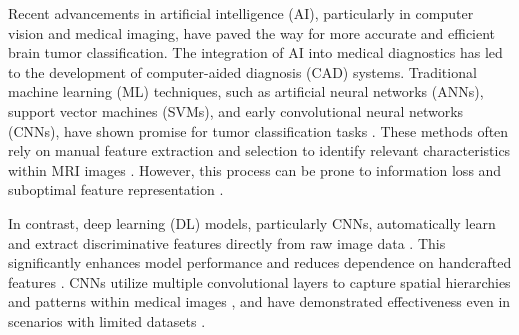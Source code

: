 \documentclass[a4paper,fleqn]{cas-sc}
\begin{document}
Recent advancements in artificial intelligence (AI), particularly in computer vision and medical imaging, have paved the way for more accurate and efficient brain tumor classification. The integration of AI into medical diagnostics has led to the development of computer-aided diagnosis (CAD) systems. Traditional machine learning (ML) techniques, such as artificial neural networks (ANNs), support vector machines (SVMs), and early convolutional neural networks (CNNs), have shown promise for tumor classification tasks \cite{R11, R12, R13, R14, R15}. These methods often rely on manual feature extraction and selection to identify relevant characteristics within MRI images \cite{R16, R17}. However, this process can be prone to information loss and suboptimal feature representation \cite{R18}.

In contrast, deep learning (DL) models, particularly CNNs, automatically learn and extract discriminative features directly from raw image data \cite{R19}. This significantly enhances model performance and reduces dependence on handcrafted features \cite{R20}. CNNs utilize multiple convolutional layers to capture spatial hierarchies and patterns within medical images \cite{R21}, and have demonstrated effectiveness even in scenarios with limited datasets \cite{R22}.
\end{document}
